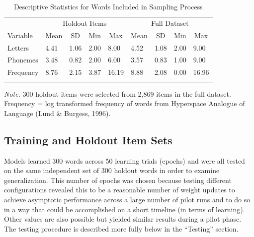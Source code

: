 \documentclass[
  ,man,floatsintext]{apa6}
\begin{document}
\begin{table}[tbp]

\begin{center}
\begin{threeparttable}

\caption{\label{tab:table1}Descriptive Statistics for Words Included in Sampling Process}

\begin{tabular}{lllllllll}
\toprule
 & \multicolumn{4}{c}{Holdout Items} & \multicolumn{4}{c}{Full Dataset} \\
\cmidrule(r){2-5} \cmidrule(r){6-9}
Variable & \multicolumn{1}{c}{Mean} & \multicolumn{1}{c}{SD} & \multicolumn{1}{c}{Min} & \multicolumn{1}{c}{Max} & \multicolumn{1}{c}{Mean} & \multicolumn{1}{c}{SD} & \multicolumn{1}{c}{Min} & \multicolumn{1}{c}{Max}\\
\midrule
Letters & 4.41 & 1.06 & 2.00 & 8.00 & 4.52 & 1.08 & 2.00 & 9.00\\
Phonemes & 3.48 & 0.82 & 2.00 & 6.00 & 3.57 & 0.83 & 1.00 & 9.00\\
Frequency & 8.76 & 2.15 & 3.87 & 16.19 & 8.88 & 2.08 & 0.00 & 16.96\\
\bottomrule
\addlinespace
\end{tabular}

\begin{tablenotes}[para]
\normalsize{\textit{Note.} 300 holdout items were selected from 2,869 items in the full dataset. Frequency = log transformed frequency of words from Hyperspace Analogue of Language (Lund \& Burgess, 1996).}
\end{tablenotes}

\end{threeparttable}
\end{center}

\end{table}

\subsection{Training and Holdout Item Sets}\label{training-and-holdout-item-sets}

Models learned 300 words across 50 learning trials (epochs) and were all tested on the same independent set of 300 holdout words in order to examine generalization. This number of epochs was chosen because testing different configurations revealed this to be a reasonable number of weight updates to achieve asymptotic performance across a large number of pilot runs and to do so in a way that could be accomplished on a short timeline (in terms of learning). Other values are also possible but yielded similar results during a pilot phase. The testing procedure is described more fully below in the ``Testing'' section.
\end{document}
